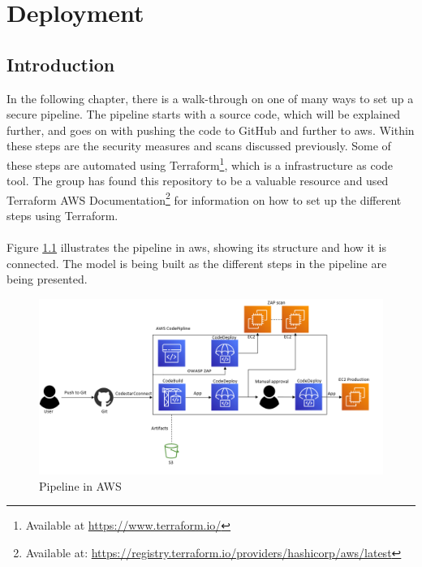 \chapter{Deployment}
\label{Deployment}
\section{Introduction}
In the following chapter, there is a walk-through on one of many ways to set up a secure pipeline. The pipeline starts with a source code, which will be explained further, and goes on with pushing the code to GitHub and further to \acrshort{aws}. Within these steps are the security measures and scans discussed previously. Some of these steps are automated using Terraform\footnote{Available at \url{https://www.terraform.io/}}, which is a \gls{infrastructure as code} tool. The group has found this repository to be a valuable resource \cite{aws-cicd-pipeline} and used Terraform AWS Documentation\footnote{Available at: \url{https://registry.terraform.io/providers/hashicorp/aws/latest}} for information on how to set up the different steps using Terraform. 
\\~\\
Figure \ref{fig: Pipeline in AWS} illustrates the pipeline in \acrshort{aws}, showing its structure and how it is connected. The model is being built as the different steps in the pipeline are being presented.
\vspace{2mm}
\begin{figure}[H]
    \centering
    \includegraphics[width=1\columnwidth]{Images/aws-piplin-7.png}
    \caption{Pipeline in AWS}
    \label{fig: Pipeline in AWS}
\end{figure}

